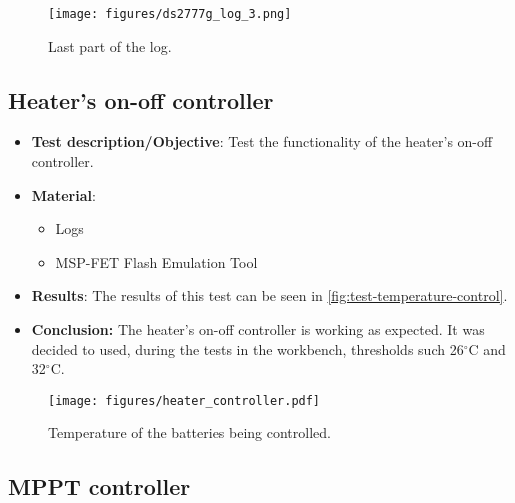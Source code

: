 \begin{figure}[!ht]
    \begin{center}
        \texttt{[image: figures/ds2777g\_log\_3.png]}
        \caption{Last part of the log.}
        \label{fig:test-battery-monitor-3}
    \end{center}
\end{figure}

\subsection{Heater's on-off controller}

\begin{itemize}
    \item \textbf{Test description/Objective}: Test the functionality of the heater's on-off controller.
    \item \textbf{Material}:
        \begin{itemize}
            \item Logs
            \item MSP-FET Flash Emulation Tool
        \end{itemize}
    \item \textbf{Results}: The results of this test can be seen in \autoref{fig:test-temperature-control}.
    \item \textbf{Conclusion:} The heater's on-off controller is working as expected. It was decided to used, during the tests in the workbench, thresholds such 26$^{\circ}$C and 32$^{\circ}$C.  
\end{itemize}

\begin{figure}[!ht]
    \begin{center}
        \texttt{[image: figures/heater\_controller.pdf]}
        \caption{Temperature of the batteries being controlled.}
        \label{fig:test-temperature-control}
    \end{center}
\end{figure}

\subsection{MPPT controller}

